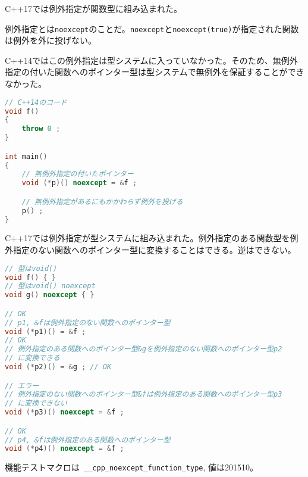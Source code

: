 %

C++17では例外指定が関数型に組み込まれた。

例外指定とは\lstinline!noexcept!のことだ。\lstinline!noexcept!と\lstinline!noexcept(true)!が指定された関数は例外を外に投げない。

C++14ではこの例外指定は型システムに入っていなかった。そのため、無例外指定の付いた関数へのポインター型は型システムで無例外を保証することができなかった。

\begin{lstlisting}[language=C++]
// C++14のコード
void f()
{
    throw 0 ; 
}

int main()
{
    // 無例外指定の付いたポインター
    void (*p)() noexcept = &f ;

    // 無例外指定があるにもかかわらず例外を投げる
    p() ;
}
\end{lstlisting}

C++17では例外指定が型システムに組み込まれた。例外指定のある関数型を例外指定のない関数へのポインター型に変換することはできる。逆はできない。

\begin{lstlisting}[language=C++]
// 型はvoid()
void f() { }
// 型はvoid() noexcept
void g() noexcept { }

// OK
// p1, &fは例外指定のない関数へのポインター型
void (*p1)() = &f ;
// OK
// 例外指定のある関数へのポインター型&gを例外指定のない関数へのポインター型p2
// に変換できる
void (*p2)() = &g ; // OK

// エラー
// 例外指定のない関数へのポインター型&fは例外指定のある関数へのポインター型p3
// に変換できない
void (*p3)() noexcept = &f ;

// OK
// p4, &fは例外指定のある関数へのポインター型
void (*p4)() noexcept = &f ;
\end{lstlisting}

機能テストマクロは~\lstinline!__cpp_noexcept_function_type!, 値は201510。
